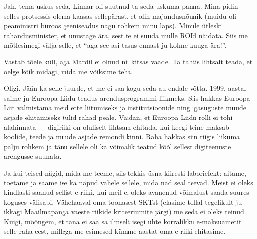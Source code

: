 
Jah, tema uskus seda, Linnar oli suutnud ta seda 
uskuma panna. Mina pidin selles protsessis olema kaasas sellepärast, et 
olin majandusnõunik (muidu oli peaministri büroos geeniseadus nagu rohkem minu laps). Minule ütleski rahandusminister, et unustage ära, sest te ei 
suuda mulle ROId näidata. Siis me mõtlesimegi välja selle, et \enquote{aga 
see asi tasus ennast ju kolme kuuga ära!}.


Vastab tõele küll, aga Mardil ei olnud nii kitsas vaade. Ta tahtis lihtsalt 
teada, et öelge kõik midagi, mida me võiksime teha.


Oligi. Jään ka selle juurde, et me ei saa kogu seda au endale võtta. 
1999. aastal saime ju Euroopa Liidu teadus-arendusprogrammi liikmeks. Siis hakkas Euroopa Liit valmistama meid ette 
liitumiseks ja institutsioonide ning igasuguste muude asjade ehitamiseks tulid rahad peale. Väidan, et Euroopa Liidu rolli ei tohi alahinnata --- 
digiriiki on oluliselt lihtsam ehitada, kui keegi teine maksab koolide, teede ja muude asjade 
remondi kinni. Raha hakkas siin riigis liikuma palju rohkem ja tänu sellele oli ka võimalik 
teatud kõõl sellest digiteenuste arengusse suunata.


Ja kui teised nägid, mida me teeme, siis tekkis üsna kiiresti laboriefekt: 
aitame, toetame ja saame ise ka näpud vahele sellele, mida nad seal teevad. Meist ei oleks
kindlasti saanud sellist e-riiki, kui meil ei oleks avanenud 
võimalust saada suures koguses välisabi. Vähehaaval oma toonasest SKTst (elasime tollal tegelikult ju ikkagi Maailmapanga vaeste riikide 
kriteeriumite järgi) me seda ei oleks teinud. Kuigi, mööngem, et 
täna ei saa sa ilmselt isegi ühte korralikku e-maksuametit selle raha eest, millega me 
esimesed kümme aastat oma e-riiki ehitasime.

